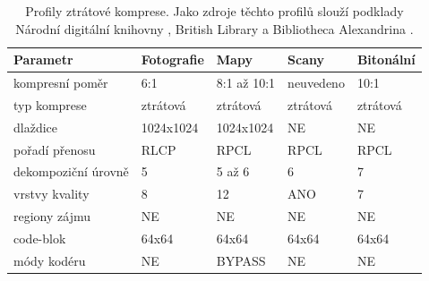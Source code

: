 \begin{table}[ht!]
\small
    \setlength{\tabcolsep}{3pt} %
    \renewcommand{\arraystretch}{1.5} %
    \begin{tabular}{|p{4cm}||p{2.5cm}|p{2.5cm}|p{2.5cm}|p{2.5cm}|}
      \hline
      \textbf{Parametr}             & \textbf{Fotografie}          & \textbf{Mapy}      & \textbf{Scany}    & \textbf{Bitonální} \\ 
      \hline
      kompresní poměr               & 6:1                          & 8:1 až 10:1        & neuvedeno         & 10:1 \\ 
      typ komprese                  & ztrátová                     & ztrátová           & ztrátová          & ztrátová \\ 
      dlaždice                      & 1024x1024                    & 1024x1024          & NE                & NE \\ 
      pořadí přenosu                & RLCP                         & RPCL               & RPCL              & RPCL \\ 
      dekompoziční úrovně           & 5                            & 5 až 6             & 6                 & 7 \\ 
      vrstvy kvality                & 8                            & 12                 & ANO               & 7 \\ 
      regiony zájmu                           & NE                           & NE                 & NE                & NE \\ 
      code-blok                    & 64x64                        & 64x64              & 64x64             & 64x64 \\ 
      módy kodéru                 & NE                           & BYPASS             & NE                & NE \\ 
      \hline
    \end{tabular}
    \caption{Profily ztrátové komprese. Jako zdroje těchto profilů slouží podklady Národní digitální knihovny \cite{ndk}, British Library \cite{bl} a Bibliotheca Alexandrina \cite{al}.} 
\end{table}

